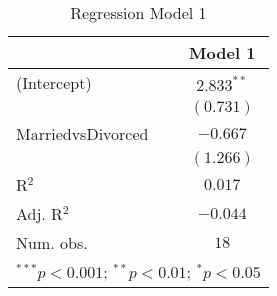 
\begin{table}
\begin{center}
\begin{tabular}{l c}
\hline
 & Model 1 \\
\hline
(Intercept)       & $2.833^{**}$ \\
                  & $(0.731)$    \\
MarriedvsDivorced & $-0.667$     \\
                  & $(1.266)$    \\
\hline
R$^2$             & $0.017$      \\
Adj. R$^2$        & $-0.044$     \\
Num. obs.         & $18$         \\
\hline
\multicolumn{2}{l}{\scriptsize{$^{***}p<0.001$; $^{**}p<0.01$; $^{*}p<0.05$}}
\end{tabular}
\caption{Regression Model 1}
\label{tab:lm_model_1}
\end{center}
\end{table}

